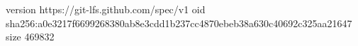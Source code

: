 version https://git-lfs.github.com/spec/v1
oid sha256:a0e3217f6699268380ab8e3cdd1b237cc4870ebeb38a630c40692c325aa21647
size 469832
